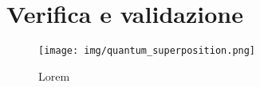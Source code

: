 
\chapter{Verifica e validazione}
\label{cap:verifica-validazione}

\begin{figure}[h!]
    \centering
    \texttt{[image: img/quantum\_superposition.png]}
    \caption{Lorem}
    \label{fig:enter-label}
\end{figure}

\lipsum[1-2]